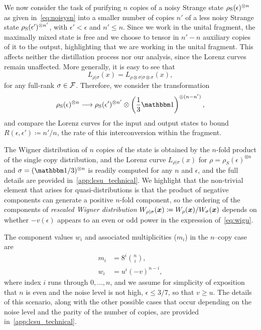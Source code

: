 \documentclass[pra,
aps,
twocolumn,
superscriptaddress,
groupedaddress,
nofootinbib,
reprint
]{revtex4-1}
\begin{document}
We now consider the task of purifying $n$ copies of a noisy Strange state $\rho_{\rm{S}}(\epsilon)^{\otimes n}$ as given in~\cref{eq:noisysn} into a smaller number of copies $n'$ of a less noisy Strange state $\rho_{\rm{S}}(\epsilon')^{\otimes n'}$, with $\epsilon' < \epsilon$ and $n' \leq n$. Since we work in the unital fragment, the maximally mixed state is free and we choose to tensor in $n'-n$ auxiliary copies of it to the output, highlighting that we are working in the unital fragment. This affects neither the distillation process nor our analysis, since the Lorenz curves remain unaffected. More generally, it is easy to see that
\begin{equation}
	L_{\rho |\sigma} (x) = L_{\rho \otimes \sigma |\sigma \otimes \sigma}(x),
\end{equation}
for any full-rank $\sigma \in {\mathcal F}$. Therefore, we consider the transformation
\begin{equation}\label{eq:sudist}
	\rho_{\rm{S}}(\epsilon)^{\otimes n} \longrightarrow \rho_{\rm{S}}(\epsilon')^{\otimes n'} \otimes \left( \frac{1}{3}\id \right)^{\otimes (n-n')},
\end{equation}
and compare the Lorenz curves for the input and output states to bound $R(\epsilon, \epsilon') \coloneqq n'/n$, the rate of this interconversion within the fragment.

The Wigner distribution of $n$ copies of the state is obtained by the $n$-fold product of the single copy distribution, and the Lorenz curve $L_{\rho|\sigma}(x)$ for $\rho = \rho_S(\epsilon)^{\otimes n}$ and $\sigma = (\I/3)^{\otimes n}$ is readily computed for any $n$ and $\epsilon$, and the full details are provided in~\cref{app:lcsu_technical}.
We highlight that the non-trivial element that arises for quasi-distributions is that the product of negative components can generate a positive $n$-fold component, so the ordering of the components of \emph{rescaled Wigner distribution} $W_{\rho |\sigma}(\bm{x}) \coloneqq W_{\rho}(\bm{x})/W_{\sigma}(\bm{x})$ depends on whether $-v(\epsilon)$ appears to an even or odd power in the expression of~\cref{eq:wigu}.

The component values $w_i$ and associated multiplicities ($m_i$) in the $n$--copy case are 
\begin{align}
	m_i &= 8^{i}\binom{n}{i}, \\
	w_i &= u^{i}(-v)^{n-i}, \label{eq:wigu}
\end{align}
where index $i$ runs through $0, \dots, n$, and we assume for simplicity of exposition that $n$ is even and the noise level is not high, $\epsilon \leq 3/7$, so that $v \geq u$.
The details of this scenario, along with the other possible cases that occur depending on the noise level and the parity of the number of copies, are provided in~\cref{app:lcsu_technical}.
\end{document}
